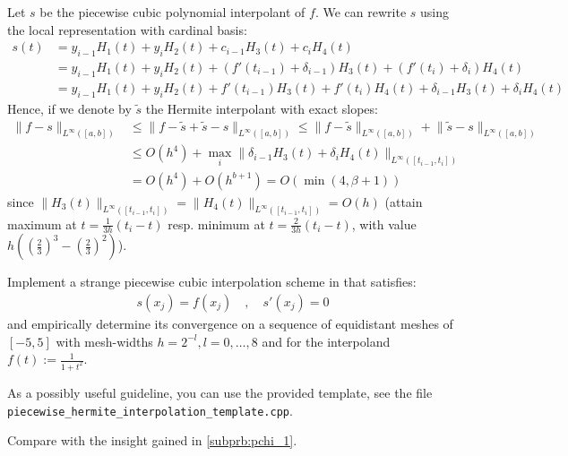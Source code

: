 \begin{problem}
\begin{subproblem}[2]
  \begin{solution}
   Let $s$ be the piecewise cubic polynomial interpolant of $f$. We can rewrite $s$ using the local representation with cardinal basis:
   \begin{align*}
    s(t) & = y_{i-1} H_1(t) + y_i H_2(t) + c_{i-1} H_3(t) + c_i H_4(t) \\
     & = y_{i-1} H_1(t) + y_i H_2(t) + (f'(t_{i-1}) + \delta_{i-1}) H_3(t) + (f'(t_i) + \delta_i) H_4(t) \\
     & = y_{i-1} H_1(t) + y_i H_2(t) + f'(t_{i-1}) H_3(t) + f'(t_i)  H_4(t) + \delta_{i-1} H_3(t) + \delta_i H_4(t)
   \end{align*}
   Hence, if we denote by $\tilde{s}$ the Hermite interpolant with exact slopes:
   \begin{align*}
    \lVert f - s \rVert_{L^\infty([a,b])} & \leq \lVert f - \tilde{s} + \tilde{s} - s \rVert_{L^\infty([a,b])} \leq \lVert f - \tilde{s} \rVert_{L^\infty([a,b])} + \lVert \tilde{s} - s \rVert_{L^\infty([a,b])} \\
    & \leq O(h^4) + \max_{i} \lVert \delta_{i-1} H_3(t) + \delta_i H_4(t) \rVert_{L^\infty([t_{i-1},t_i])} \\
    & = O(h^4) + O(h^{b+1}) = O(\min(4,\beta + 1))
   \end{align*}
  since $\lVert H_3(t) \rVert_{L^\infty([t_{i-1},t_i])} = \lVert H_4(t) \rVert_{L^\infty([t_{i-1},t_i])} = O(h)$ (attain maximum at $t = \frac{1}{3h}(t_{i} - t)$ resp. minimum at $t = \frac{2}{3h}(t_{i} - t)$, with value $h (\left(\frac{2}{3}\right)^3 - \left(\frac{2}{3}\right)^2)$).
  \end{solution}

 \end{subproblem}

 \begin{subproblem}[3]
  Implement a strange piecewise cubic interpolation scheme in \Cpp{} that satisfies:
  \begin{align*}
   s(x_j) = f(x_j)\quad,\quad s'(x_j) = 0
  \end{align*}
  and empirically determine its convergence on a sequence of equidistant meshes of $[-5,5]$ with mesh-widths $h = 2^{-l}, l = 0,\dots,8$ and for the interpoland $f(t) := \frac{1}{1+t^2}$.
  
  As a possibly useful guideline, you can use the provided \Cpp{} template, see the file \verb|piecewise_hermite_interpolation_template.cpp|.
   
  Compare with the insight gained in \ref{subprb:pchi_1}.
  

\end{subproblem}
\end{problem}
